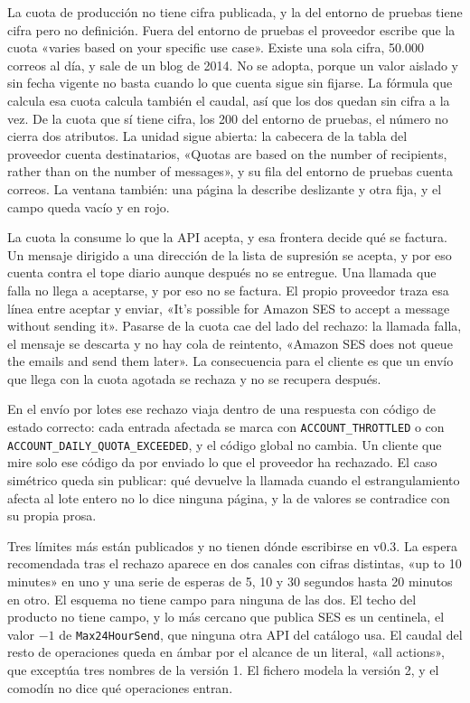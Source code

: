 La cuota de producción no tiene cifra publicada, y la del entorno de pruebas
tiene cifra pero no definición. Fuera del entorno de pruebas el proveedor
escribe que la cuota «varies based on your specific use case». Existe una sola
cifra, 50.000 correos al día, y sale de un blog de 2014. No se adopta, porque
un valor aislado y sin fecha vigente no basta cuando lo que cuenta
sigue sin fijarse. La fórmula que calcula esa cuota calcula también el
caudal, así que los dos quedan sin cifra a la vez. De la cuota que sí tiene
cifra, los 200 del entorno de pruebas, el número no cierra dos atributos. La
unidad sigue abierta: la cabecera de la tabla del proveedor cuenta
destinatarios, «Quotas are based on the number of recipients, rather than on
the number of messages», y su fila del entorno de pruebas cuenta correos. La
ventana también: una página la describe deslizante y otra fija, y el campo queda
vacío y en rojo.

La cuota la consume lo que la API acepta, y esa frontera decide qué se
factura. Un mensaje dirigido a una dirección de
la lista de supresión se acepta, y por eso cuenta contra el tope diario
aunque después no se entregue. Una llamada que falla no llega a aceptarse, y
por eso no se factura. El propio proveedor traza esa línea entre aceptar y
enviar, «It's possible for Amazon SES to accept a message without sending
it». Pasarse de la cuota cae del lado del rechazo: la llamada falla,
el mensaje se descarta y no hay cola de reintento, «Amazon SES does not
queue the emails and send them later». La consecuencia para el cliente es que
un envío que llega con la cuota agotada se rechaza y no se recupera después.

En el envío por lotes ese rechazo viaja dentro de una respuesta con código
de estado correcto: cada entrada afectada se marca con
\texttt{ACCOUNT\_THROTTLED} o con
\texttt{ACCOUNT\_DAILY\_\allowbreak QUOTA\_\allowbreak EXCEEDED}, y el código
global no cambia. Un cliente que mire solo ese código da por enviado lo que
el proveedor ha rechazado. El caso simétrico queda sin publicar: qué devuelve
la llamada cuando el estrangulamiento afecta al lote entero no lo dice
ninguna página, y la de valores se contradice con su propia prosa.

Tres límites más están publicados y no tienen dónde escribirse en v0.3. La
espera recomendada tras el rechazo aparece en dos canales con cifras
distintas, «up to 10 minutes» en uno y una serie de esperas de 5, 10 y 30
segundos hasta 20 minutos en otro. El esquema no tiene campo para ninguna de las dos. El techo del
producto no tiene campo, y lo más cercano que publica SES es un centinela,
el valor $-1$ de \texttt{Max24HourSend}, que ninguna otra API del catálogo
usa. El caudal del resto de operaciones queda en ámbar por el alcance de un
literal, «all actions», que exceptúa tres nombres de la versión 1. El fichero
modela la versión 2, y el comodín no dice qué operaciones entran.

